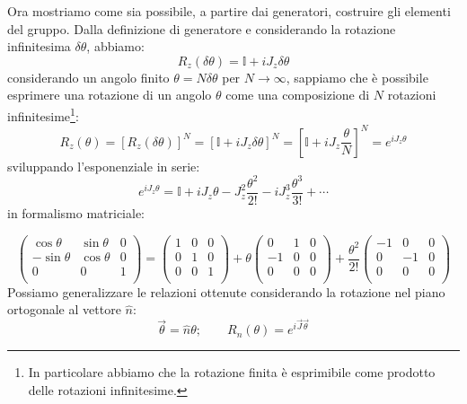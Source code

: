 Ora mostriamo come sia possibile, a partire dai generatori, costruire gli elementi del gruppo. Dalla definizione di generatore e considerando la rotazione infinitesima $\delta \theta$, abbiamo:
\begin{equation}
    R_z(\delta\theta)=\mathds{I}+iJ_z\delta\theta
\end{equation}
considerando un angolo finito $\theta=N\delta\theta$ per $N\xrightarrow{}\infty$, sappiamo che è possibile esprimere una rotazione di un angolo $\theta$ come una composizione di  $N$ rotazioni infinitesime\footnote{In particolare abbiamo che la rotazione finita è esprimibile come prodotto delle rotazioni infinitesime.}:
\begin{equation}
    R_z(\theta)=\left[R_z(\delta\theta)\right]^N=\left[\mathds{I}+iJ_z\delta\theta\right]^N=\left[\mathds{I}+iJ_z\dfrac{\theta}{N}\right]^N=e^{iJ_z\theta}
\end{equation}
sviluppando l'esponenziale in serie:
\begin{equation}
    e^{iJ_z\theta}=\mathds{I}+iJ_z\theta-J_z^2\dfrac{\theta^2}{2!}-iJ_z^3\dfrac{\theta^3}{3!}+\cdots
\end{equation}
in formalismo matriciale:

\begin{equation*}
    \begin{pmatrix}
 \cos{\theta}&\sin{\theta}&0  \\
  -\sin{\theta}&\cos{\theta}&0\\
0&0&1\\
\end{pmatrix}= \begin{pmatrix}
 1&0&0  \\
 0&1&0\\
0&0&1\\
\end{pmatrix}+\theta\begin{pmatrix}
 0&1&0  \\
 -1&0&0\\
0&0&0\\
\end{pmatrix}+\dfrac{\theta^2}{2!}\begin{pmatrix}
 -1&0&0  \\
0 &-1&0\\
0&0&0\\
\end{pmatrix}
\end{equation*}
Possiamo generalizzare le relazioni ottenute considerando la rotazione nel piano ortogonale al vettore $\hat{n}$:
\begin{equation}
    \Vec{\theta}=\hat{n}\theta; \qquad R_n(\theta)=e^{i\Vec{J}\Vec{\theta}}
\end{equation}


